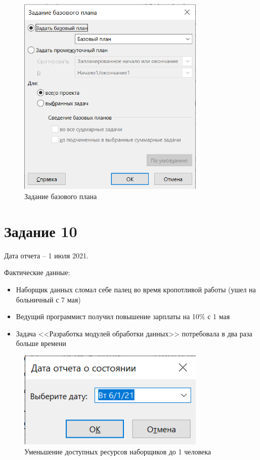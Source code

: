 \begin{figure}[H]
    \centering
    \includegraphics[width=0.8\textwidth]{img/content/task_09_2.png}
    \caption{Задание базового плана}
    \label{fig:task_09_2}
\end{figure}

\section{Задание 10}

Дата отчета -- 1 июля 2021.

Фактические данные:

\begin{itemize}
    \item Наборщик данных сломал себе палец во время кропотливой работы (ушел на больничный с 7 мая)
    \item Ведущий программист получил повышение зарплаты на 10\% с 1 мая
    \item Задача <<Разработка модулей обработки данных>> потребовала в два раза больше времени
\end{itemize}

\begin{figure}[H]
    \centering
    \includegraphics[width=0.8\textwidth]{img/content/task_10_1_1.png}
    \caption{Уменьшение доступных ресурсов наборщиков до 1 человека}
    \label{fig:task_10_1_1}
\end{figure}

